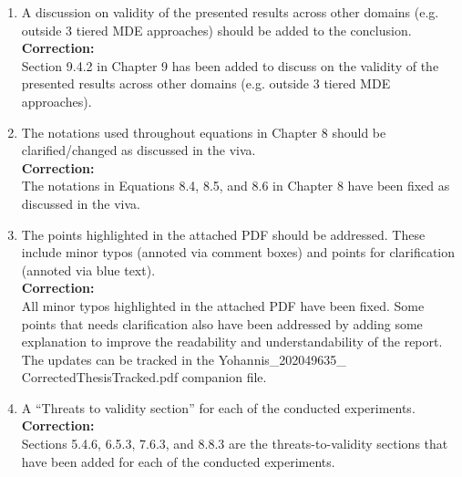 \documentclass[11pt, a4paper]{report}
\begin{document}
\begin{enumerate}[font=\bfseries]
\item A discussion on validity of the presented results across other domains (e.g. outside 3 tiered MDE approaches) should be added to the conclusion.
\\\textbf{Correction:}\\
Section 9.4.2 in Chapter 9 has been added to discuss on the validity of the presented results across other domains (e.g. outside 3 tiered MDE approaches).

\item The notations used throughout equations in Chapter 8 should be clarified/changed as discussed in the viva.
\\\textbf{Correction:}\\
The notations in Equations 8.4, 8.5, and 8.6 in Chapter 8 have been fixed as discussed in the viva.

\item The points highlighted in the attached PDF should be addressed. These include minor typos (annoted via comment boxes) and points for clarification (annoted via blue text).
\\\textbf{Correction:}\\
All minor typos highlighted in the attached PDF have been fixed. Some points that needs clarification also have been addressed by adding some explanation to improve the readability and understandability of the report. The updates can be tracked in the Yohannis\_202049635\_ CorrectedThesisTracked.pdf companion file. 

\item A ``Threats to validity section'' for each of the conducted experiments.
\\\textbf{Correction:}\\
Sections 5.4.6, 6.5.3, 7.6.3, and 8.8.3 are the threats-to-validity sections  that have been added for each of the conducted experiments. 

\end{enumerate}
\end{document}
